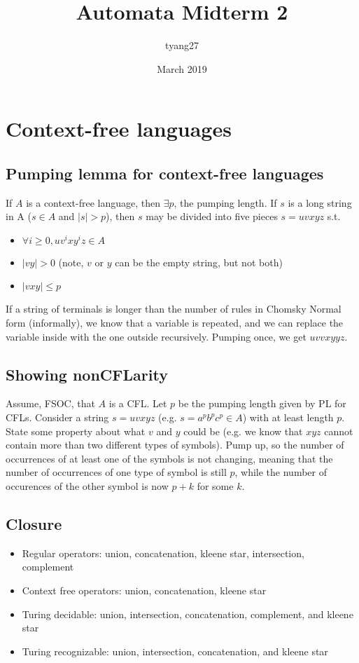\documentclass{article}
\title{Automata Midterm 2}
\author{tyang27 }
\date{March 2019}
\begin{document}
\maketitle

\section{Context-free languages}
\subsection{Pumping lemma for context-free languages}
If $A$ is a context-free language, then $\exists p$, the pumping length. If $s$ is a long string in A ($s \in A$ and $|s| > p$), then $s$ may be divided into five pieces $s=uvxyz$ s.t.
\begin{itemize}
    \item $\forall i \geq 0,uv^i xy^i z \in A$
    \item $|vy|>0$ (note, $v$ or $y$ can be the empty string, but not both)
    \item $|vxy| \leq p$
\end{itemize}
If a string of terminals is longer than the number of rules in Chomsky Normal form (informally), we know that a variable is repeated, and we can replace the variable inside with the one outside recursively. Pumping once, we get $uvvxyyz$.

\subsection{Showing nonCFLarity}
Assume, FSOC, that $A$ is a CFL. Let $p$ be the pumping length given by PL for CFLs. Consider a string $s=uvxyz$ (e.g. $s=a^p b^p c^p \in A$) with at least length $p$. State some property about what $v$ and $y$ could be (e.g. we know that $xyz$ cannot contain more than two different types of symbols). Pump up, so the number of occurrences of at least one of the symbols is not changing, meaning that the number of occurrences of one type of symbol is still $p$, while the number of occurences of the other symbol is now $p+k$ for some $k$.

\subsection{Closure}
\begin{itemize}
    \item Regular operators: union, concatenation, kleene star, intersection, complement
    \item Context free operators: union, concatenation, kleene star
    \item Turing decidable: union, intersection, concatenation, complement, and kleene star
    \item Turing recognizable: union, intersection, concatenation, and kleene star
\end{itemize}
\end{document}
